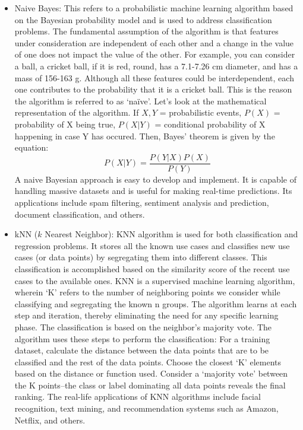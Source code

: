 \documentclass[11pt]{article}
\begin{document}
\begin{itemize}
\item Naive Bayes: This refers to a probabilistic machine learning algorithm based on the Bayesian probability model and is used to address classification problems. The fundamental assumption of the algorithm is that features under consideration are independent of each other and a change in the value of one does not impact the value of the other. For example, you can consider a ball, a cricket ball, if it is red, round, has a 7.1-7.26 cm diameter, and has a mass of 156-163 g. Although all these features could be interdependent, each one contributes to the probability that it is a cricket ball. This is the reason the algorithm is referred to as ‘naïve’. Let’s look at the mathematical representation of the algorithm.
If $X, Y$ = probabilistic events, $P(X)$ = probability of X being true, $P(X \vert Y)$ = conditional probability of X happening in case Y has occured. Then, Bayes’ theorem is given by the equation:
\begin{equation}
P(X \vert Y) = \frac{P(Y \vert X) P(X)}{P(Y)}
\end{equation}
A naive Bayesian approach is easy to develop and implement. It is capable of handling massive datasets and is useful for making real-time predictions. 
Its applications include spam filtering, sentiment analysis and prediction, document classification, and others.
\item kNN ($k$ Nearest Neighbor): KNN algorithm is used for both classification and regression problems. It stores all the known use cases and classifies new use cases (or data points) by segregating them into different classes. This classification is accomplished based on the similarity score of the recent use cases to the available ones. KNN is a supervised machine learning algorithm, wherein ‘K’ refers to the number of neighboring points we consider while classifying and segregating the known n groups. The algorithm learns at each step and iteration, thereby eliminating the need for any specific learning phase. The classification is based on the neighbor’s majority vote.
The algorithm uses these steps to perform the classification:
For a training dataset, calculate the distance between the data points that are to be classified and the rest of the data points.
Choose the closest ‘K’ elements based on the distance or function used.
Consider a ‘majority vote’ between the K points–the class or label dominating all data points reveals the final ranking. 
The real-life applications of KNN algorithms include facial recognition, text mining, and recommendation systems such as Amazon, Netflix, and others.


\end{itemize}
\end{document}
